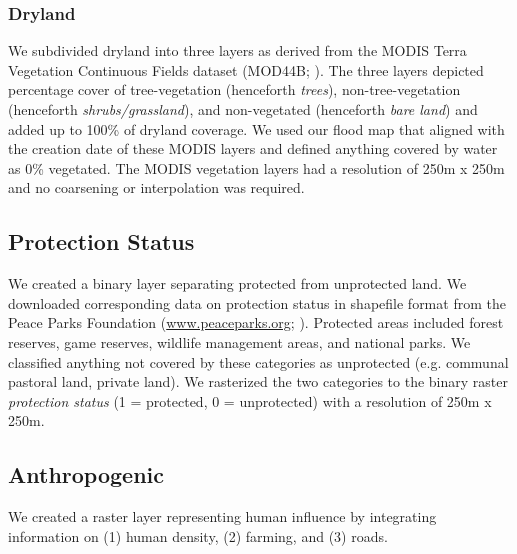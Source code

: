 \documentclass[abstract=off,10pt,a4paper,bibliography=totocnumbered]{article}
\begin{document}
\subsubsection{Dryland}
We subdivided dryland into three layers as derived from the MODIS Terra
Vegetation Continuous Fields dataset (MOD44B; \citealp{Dimiceli.2015}). The
three layers depicted percentage cover of tree-vegetation (henceforth
\textit{trees}), non-tree-vegetation (henceforth \textit{shrubs/grassland}), and
non-vegetated (henceforth \textit{bare land}) and added up to 100\% of dryland
coverage. We used our flood map that aligned with the creation date of these
MODIS layers and defined anything covered by water as 0\% vegetated. The MODIS
vegetation layers had a resolution of 250m x 250m and no coarsening or
interpolation was required.

\subsection{Protection Status}
We created a binary layer separating protected from unprotected land. We
downloaded corresponding data on protection status in shapefile format from the
Peace Parks Foundation (\url{www.peaceparks.org}; \citealp{PeaceParks.2019}).
Protected areas included forest reserves, game reserves, wildlife management
areas, and national parks. We classified anything not covered by these
categories as unprotected (e.g. communal pastoral land, private land). We
rasterized the two categories to the binary raster \textit{protection status} (1
= protected, 0 = unprotected) with a resolution of 250m x 250m.

\subsection{Anthropogenic}
We created a raster layer representing human influence by integrating
information on (1) human density, (2) farming, and (3) roads.
\end{document}
